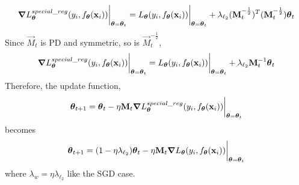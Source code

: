 \begin{enumerate}[(a)]
{\begin{enumerate}[(i)]
{        \begin{equation}
            \grad L_{\boldsymbol{\mathbf{\theta}}}^{special\_reg}(y_i, f_{\boldsymbol{\mathbf{\theta}}}(\boldsymbol{\mathbf{x}}_i))\bigg|_{\boldsymbol{\mathbf{\theta}} = \boldsymbol{\mathbf{\theta}}_t} = L_{\boldsymbol{\mathbf{\theta}}}(y_i, f_{\boldsymbol{\mathbf{\theta}}}(\boldsymbol{\mathbf{x}}_i))\bigg|_{\boldsymbol{\mathbf{\theta}} = \boldsymbol{\mathbf{\theta}}_t} + \lambda_{\ell_2}(\boldsymbol{\mathbf{M}}_t^{-\frac{1}{2}})^T (\boldsymbol{\mathbf{M}}_t^{-\frac{1}{2}})\boldsymbol{\mathbf{\theta}}_t
        \end{equation}
        Since $\vec{M}_t$ is PD and symmetric, so is $\vec{M}_t^{-\frac{1}{2}}$,
        \begin{equation}
            \grad L_{\boldsymbol{\mathbf{\theta}}}^{special\_reg}(y_i, f_{\boldsymbol{\mathbf{\theta}}}(\boldsymbol{\mathbf{x}}_i))\bigg|_{\boldsymbol{\mathbf{\theta}} = \boldsymbol{\mathbf{\theta}}_t} = L_{\boldsymbol{\mathbf{\theta}}}(y_i, f_{\boldsymbol{\mathbf{\theta}}}(\boldsymbol{\mathbf{x}}_i))\bigg|_{\boldsymbol{\mathbf{\theta}} = \boldsymbol{\mathbf{\theta}}_t} + \lambda_{\ell_2}\boldsymbol{\mathbf{M}}_t^{-1}\boldsymbol{\mathbf{\theta}}_t
        \end{equation}
        Therefore, the update function,
        \begin{equation}
            \boldsymbol{\mathbf{\theta}}_{t+1} = \boldsymbol{\mathbf{\theta}}_t - \eta \boldsymbol{\mathbf{M}}_t\grad L_{\boldsymbol{\mathbf{\theta}}}^{special\_reg}(y_i, f_{\boldsymbol{\mathbf{\theta}}}(\boldsymbol{\mathbf{x}}_i))\bigg|_{\boldsymbol{\mathbf{\theta}} = \boldsymbol{\mathbf{\theta}}_t}
        \end{equation}
        becomes
        \begin{equation}
            \boldsymbol{\mathbf{\theta}}_{t+1} = (1 - \eta \lambda_{\ell_2})\boldsymbol{\mathbf{\theta}}_t - \eta \boldsymbol{\mathbf{M}}_t\grad L_{\boldsymbol{\mathbf{\theta}}}(y_i, f_{\boldsymbol{\mathbf{\theta}}}(\boldsymbol{\mathbf{x}}_i))\bigg|_{\boldsymbol{\mathbf{\theta}} = \boldsymbol{\mathbf{\theta}}_t}
        \end{equation}
        where $\lambda_w = \eta \lambda_{\ell_2}$ like the SGD case. 
        
        }
    \end{enumerate}
    
    
    }
    
    
    
\end{enumerate}